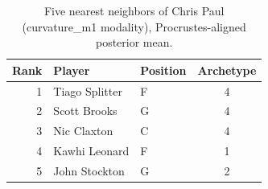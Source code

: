 \begin{table}[htbp]
  \centering\small
  \begin{tabular}{rllc}
    \toprule
    Rank & Player & Position & Archetype \\
    \midrule
    1 & Tiago Splitter & F & 4 \\
    2 & Scott Brooks & G & 4 \\
    3 & Nic Claxton & C & 4 \\
    4 & Kawhi Leonard & F & 1 \\
    5 & John Stockton & G & 2 \\
    \bottomrule
  \end{tabular}
  \caption{Five nearest neighbors of Chris Paul (curvature_m1 modality), Procrustes-aligned posterior mean.}
  \label{tab:Chris_Paul_neighbors_curvature_m1}
\end{table}

